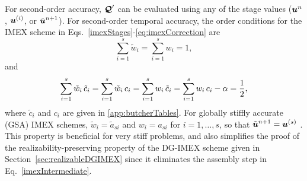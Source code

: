 For second-order accuracy, $\boldsymbol{\mathcal{Q}}'$ can be evaluated using any of the stage values ($\boldsymbol{u}^{n}$, $\boldsymbol{u}^{(i)}$, or $\tilde{\boldsymbol{u}}^{n+1}$).  
For second-order temporal accuracy, the order conditions for the IMEX scheme in Eqs.~\eqref{imexStages}-\eqref{eq:imexCorrection} are \cite{hu_etal_2018}
\begin{equation}
  \sum_{i=1}^{s}\tilde{w}_{i}=\sum_{i=1}^{s}w_{i}=1,
  \label{orderConditions1}
\end{equation}
and
\begin{equation}
  \sum_{i=1}^{s}\tilde{w}_{i}\,\tilde{c}_{i}
  =\sum_{i=1}^{s}\tilde{w}_{i}\,c_{i}
  =\sum_{i=1}^{s}w_{i}\,\tilde{c}_{i}
  =\sum_{i=1}^{s}w_{i}\,c_{i}-\alpha=\frac{1}{2}, 
  \label{orderConditions2}
\end{equation}
where $\tilde{c}_{i}$ and $c_{i}$ are given in \ref{app:butcherTables}.  
For globally stiffly accurate (GSA) IMEX schemes, $\tilde{w}_{i}=\tilde{a}_{si}$ and $w_{i}=a_{si}$ for $i=1,\ldots,s$, so that $\tilde{\boldsymbol{u}}^{n+1}=\boldsymbol{u}^{(s)}$ \cite{ascher_etal_1997}.  
This property is beneficial for very stiff problems, and also simplifies the proof of the realizability-preserving property of the DG-IMEX scheme given in Section~\ref{sec:realizableDGIMEX} since it eliminates the assembly step in Eq.~\eqref{imexIntermediate}.  

